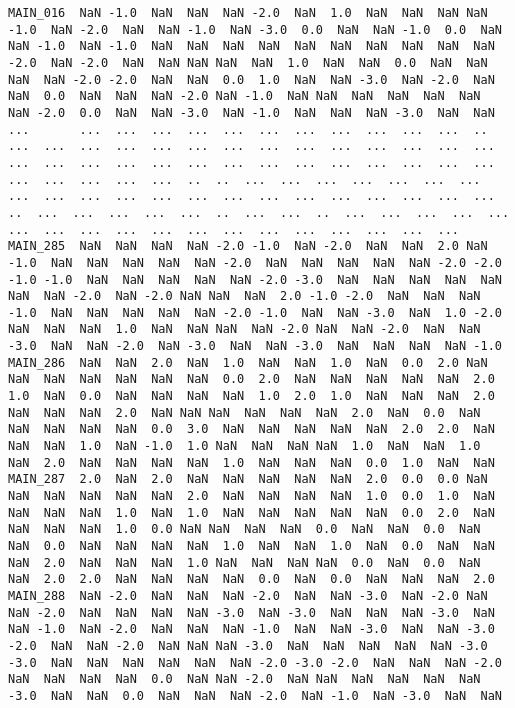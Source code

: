 \documentclass[a4paper,10pt,onecolumn,oneside,openright]{article}
\begin{document}
\begin{verbatim}
MAIN_016  NaN -1.0  NaN  NaN  NaN -2.0  NaN  1.0  NaN  NaN  NaN NaN -1.0  NaN -2.0  NaN  NaN -1.0  NaN -3.0  0.0  NaN  NaN -1.0  0.0  NaN  NaN -1.0  NaN -1.0  NaN  NaN  NaN  NaN  NaN  NaN  NaN  NaN  NaN  NaN -2.0  NaN -2.0  NaN  NaN NaN NaN  NaN  1.0  NaN  NaN  0.0  NaN  NaN  NaN  NaN -2.0 -2.0  NaN  NaN  0.0  1.0  NaN  NaN -3.0  NaN -2.0  NaN NaN  0.0  NaN  NaN  NaN -2.0 NaN -1.0  NaN NaN  NaN  NaN  NaN  NaN  NaN -2.0  0.0  NaN  NaN -3.0  NaN -1.0  NaN  NaN  NaN -3.0  NaN  NaN
...       ...  ...  ...  ...  ...  ...  ...  ...  ...  ...  ...  ..  ...  ...  ...  ...  ...  ...  ...  ...  ...  ...  ...  ...  ...  ...  ...  ...  ...  ...  ...  ...  ...  ...  ...  ...  ...  ...  ...  ...  ...  ...  ...  ...  ...  ..  ..  ...  ...  ...  ...  ...  ...  ...  ...  ...  ...  ...  ...  ...  ...  ...  ...  ...  ...  ...  ...  ...  ..  ...  ...  ...  ...  ...  ..  ...  ...  ..  ...  ...  ...  ...  ...  ...  ...  ...  ...  ...  ...  ...  ...  ...  ...  ...  ...  ...
MAIN_285  NaN  NaN  NaN  NaN -2.0 -1.0  NaN -2.0  NaN  NaN  2.0 NaN -1.0  NaN  NaN  NaN  NaN  NaN -2.0  NaN  NaN  NaN  NaN  NaN -2.0 -2.0 -1.0 -1.0  NaN  NaN  NaN  NaN  NaN -2.0 -3.0  NaN  NaN  NaN  NaN  NaN  NaN  NaN -2.0  NaN -2.0 NaN NaN  NaN  2.0 -1.0 -2.0  NaN  NaN  NaN -1.0  NaN  NaN  NaN  NaN  NaN -2.0 -1.0  NaN  NaN -3.0  NaN  1.0 -2.0 NaN  NaN  NaN  1.0  NaN  NaN NaN  NaN -2.0 NaN  NaN -2.0  NaN  NaN -3.0  NaN  NaN -2.0  NaN -3.0  NaN  NaN -3.0  NaN  NaN  NaN  NaN -1.0
MAIN_286  NaN  NaN  2.0  NaN  1.0  NaN  NaN  1.0  NaN  0.0  2.0 NaN  NaN  NaN  NaN  NaN  NaN  NaN  0.0  2.0  NaN  NaN  NaN  NaN  NaN  2.0  1.0  NaN  0.0  NaN  NaN  NaN  NaN  1.0  2.0  1.0  NaN  NaN  NaN  2.0  NaN  NaN  NaN  2.0  NaN NaN NaN  NaN  NaN  NaN  2.0  NaN  0.0  NaN  NaN  NaN  NaN  NaN  0.0  3.0  NaN  NaN  NaN  NaN  NaN  2.0  2.0  NaN NaN  NaN  1.0  NaN -1.0  1.0 NaN  NaN  NaN NaN  1.0  NaN  NaN  1.0  NaN  2.0  NaN  NaN  NaN  NaN  1.0  NaN  NaN  NaN  0.0  1.0  NaN  NaN
MAIN_287  2.0  NaN  2.0  NaN  NaN  NaN  NaN  NaN  2.0  0.0  0.0 NaN  NaN  NaN  NaN  NaN  NaN  2.0  NaN  NaN  NaN  NaN  1.0  0.0  1.0  NaN  NaN  NaN  NaN  1.0  NaN  1.0  NaN  NaN  NaN  NaN  NaN  0.0  2.0  NaN  NaN  NaN  NaN  1.0  0.0 NaN NaN  NaN  NaN  0.0  NaN  NaN  0.0  NaN  NaN  0.0  NaN  NaN  NaN  NaN  1.0  NaN  NaN  1.0  NaN  0.0  NaN  NaN NaN  2.0  NaN  NaN  NaN  1.0 NaN  NaN  NaN NaN  0.0  NaN  0.0  NaN  NaN  2.0  2.0  NaN  NaN  NaN  NaN  0.0  NaN  0.0  NaN  NaN  NaN  2.0
MAIN_288  NaN -2.0  NaN  NaN  NaN -2.0  NaN  NaN -3.0  NaN -2.0 NaN  NaN -2.0  NaN  NaN  NaN  NaN -3.0  NaN -3.0  NaN  NaN  NaN -3.0  NaN  NaN -1.0  NaN -2.0  NaN  NaN  NaN -1.0  NaN  NaN -3.0  NaN  NaN -3.0 -2.0  NaN  NaN -2.0  NaN NaN NaN -3.0  NaN  NaN  NaN  NaN  NaN -3.0 -3.0  NaN  NaN  NaN  NaN  NaN  NaN -2.0 -3.0 -2.0  NaN  NaN  NaN -2.0 NaN  NaN  NaN  NaN  0.0  NaN NaN -2.0  NaN NaN  NaN  NaN  NaN  NaN -3.0  NaN  NaN  0.0  NaN  NaN  NaN -2.0  NaN -1.0  NaN -3.0  NaN  NaN

\end{verbatim}
\end{document}
